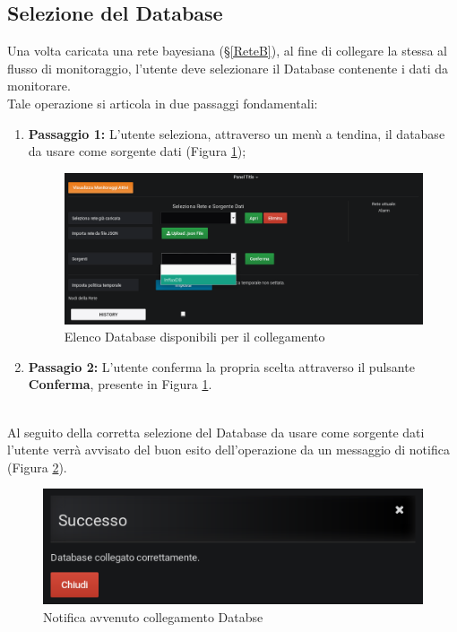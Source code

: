 \subsection{Selezione del Database}\label{SelectDB}

Una volta caricata una rete bayesiana (§\ref{ReteB}), al fine di collegare la stessa al flusso di monitoraggio, l'utente deve selezionare il Database contenente i dati da monitorare.\\
Tale operazione si articola in due passaggi fondamentali:
\begin{enumerate}
	\item \textbf{Passaggio 1:} L'utente seleziona, attraverso un menù a tendina, il database da usare come sorgente dati (Figura \ref{Sorgenti});
	\begin{figure}[H]
	\begin{center}
		\includegraphics[scale=0.35]{./images/Sorgenti.png}
		 \caption{Elenco Database disponibili per il collegamento}	
		 \label{Sorgenti}
	\end{center}
	\end{figure}
	\item \textbf{Passagio 2:} L'utente conferma la propria scelta attraverso il pulsante \textbf{Conferma}, presente in Figura \ref{Sorgenti}.
\end{enumerate}
~\\
Al seguito della corretta selezione del Database da usare come sorgente dati l'utente verrà avvisato del buon esito dell'operazione da un messaggio di notifica (Figura \ref{NotificaSorgente}). 

\begin{figure}[H]
	\begin{center}
		\includegraphics[scale=0.6]{./images/NotificaSorgente.png}
		 \caption{Notifica avvenuto collegamento Databse}	
		 \label{NotificaSorgente}
	\end{center}
\end{figure}